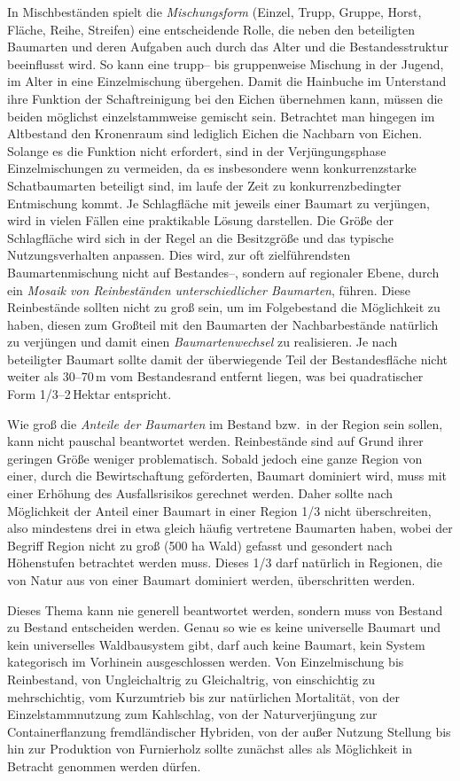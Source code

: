 \documentclass[twocolumn]{scrartcl}
\begin{document}
In Mischbeständen spielt die \emph{Mischungsform} (Einzel, Trupp,
Gruppe, Horst, Fläche, Reihe, Streifen) eine entscheidende Rolle, die
neben den beteiligten Baumarten und deren Aufgaben auch durch das
Alter und die Bestandesstruktur beeinflusst wird. So kann eine trupp--
bis gruppenweise Mischung in der Jugend, im Alter in eine
Einzelmischung übergehen. Damit die Hainbuche im Unterstand ihre
Funktion der Schaftreinigung bei den Eichen übernehmen kann, müssen
die beiden möglichst einzelstammweise gemischt sein. Betrachtet man
hingegen im Altbestand den Kronenraum sind lediglich Eichen die
Nachbarn von Eichen. Solange es die Funktion nicht erfordert, sind in
der Verjüngungsphase Einzelmischungen zu vermeiden, da es insbesondere
wenn konkurrenzstarke Schatbaumarten beteiligt sind, im laufe der Zeit
zu konkurrenzbedingter Entmischung kommt. Je Schlagfläche mit jeweils
einer Baumart zu verjüngen, wird in vielen Fällen eine praktikable
Lösung darstellen. Die Größe der Schlagfläche wird sich in der Regel
an die Besitzgröße und das typische Nutzungsverhalten anpassen. Dies
wird, zur oft zielführendsten Baumartenmischung nicht auf Bestandes--,
sondern auf regionaler Ebene, durch ein \emph{Mosaik von Reinbeständen
  unterschiedlicher Baumarten}, führen. Diese Reinbestände sollten
nicht zu groß sein, um im Folgebestand die Möglichkeit zu haben,
diesen zum Großteil mit den Baumarten der Nachbarbestände natürlich zu
verjüngen und damit einen \emph{Baumartenwechsel} zu realisieren. Je
nach beteiligter Baumart sollte damit der überwiegende Teil der
Bestandesfläche nicht weiter als 30--70\,m vom Bestandesrand entfernt
liegen, was bei quadratischer Form 1/3--2\,Hektar entspricht.

Wie groß die \emph{Anteile der Baumarten} im Bestand bzw.\ in der
Region sein sollen, kann nicht pauschal beantwortet
werden. Reinbestände sind auf Grund ihrer geringen Größe weniger
problematisch. Sobald jedoch eine ganze Region von einer, durch die
Bewirtschaftung geförderten, Baumart dominiert wird, muss mit einer
Erhöhung des Ausfallsrisikos gerechnet werden. Daher sollte nach
Möglichkeit der Anteil einer Baumart in einer Region 1/3 nicht
überschreiten, also mindestens drei in etwa gleich häufig vertretene
Baumarten haben, wobei der Begriff Region nicht zu groß (500 ha Wald)
gefasst und gesondert nach Höhenstufen betrachtet werden muss. Dieses
1/3 darf natürlich in Regionen, die von Natur aus von einer Baumart
dominiert werden, überschritten werden.

Dieses Thema kann nie generell beantwortet werden, sondern muss von
Bestand zu Bestand entscheiden werden. Genau so wie es keine
universelle Baumart und kein universelles Waldbausystem gibt, darf
auch keine Baumart, kein System kategorisch im Vorhinein
ausgeschlossen werden. Von Einzelmischung bis Reinbestand, von
Ungleichaltrig zu Gleichaltrig, von einschichtig zu mehrschichtig, vom
Kurzumtrieb bis zur natürlichen Mortalität, von der Einzelstammnutzung
zum Kahlschlag, von der Naturverjüngung zur Containerflanzung
fremdländischer Hybriden, von der außer Nutzung Stellung bis hin zur
Produktion von Furnierholz sollte zunächst alles als Möglichkeit in
Betracht genommen werden dürfen.




\end{document}

